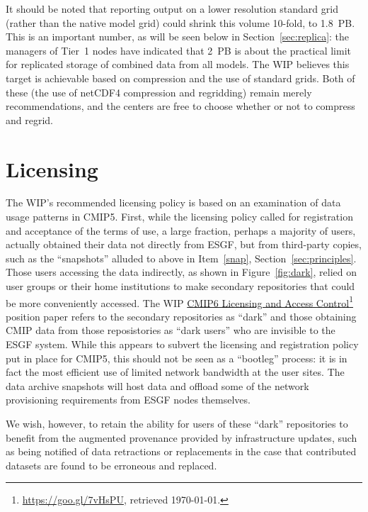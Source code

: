 \documentclass[gmd,manuscript]{copernicus}
\newcommand{\pllabel}[1]{\label{p-#1}\linelabel{l-#1}}
\newcommand{\urlref}[2] {\href{#1}{#2}\footnote{\url{#1}, retrieved \today.}}
\begin{document}
It should be noted that reporting output on a lower
resolution standard grid (rather than the native model grid) could
shrink this volume 10-fold, to 1.8~PB. This is an important number, as
will be seen below in Section~\ref{sec:replica}: the managers of Tier~1 nodes
have indicated that 2~PB is about the practical limit for replicated
storage of combined data from all models. The WIP believes
this target is achievable based on compression and the use of standard
grids. Both of these (the use of netCDF4 compression and regridding)
remain merely recommendations, and the centers are free to choose
whether or not to compress and regrid.

\section{Licensing}
\label{sec:licensing}

The WIP's recommended licensing policy is based on an examination of
data usage patterns in CMIP5. First, while the licensing policy called
for registration and acceptance of the terms of use, a large fraction,
perhaps a majority of users, actually obtained their data not directly
from ESGF, but from
\pllabel{RC1-33}
third-party copies, such as the ``snapshots'' alluded to above in
Item~\ref{snap}, Section~\ref{sec:principles}. Those users accessing
the data indirectly, as shown in Figure~\ref{fig:dark}, relied on user
groups or their home institutions to make secondary repositories that
could be more conveniently accessed. The WIP
\urlref{https://goo.gl/7vHsPU}{CMIP6 Licensing and Access Control}
position paper refers to the secondary repositories as ``dark'' and
those obtaining CMIP data from those reposistories as ``dark users''
who are invisible to the ESGF system. While this appears to subvert
the licensing and registration policy put in place for CMIP5, this
should not be seen as a ``bootleg'' process: it is in fact the most
efficient use of limited network bandwidth at the user sites.
\pllabel{RC2-29}
The data archive snapshots will host data and offload some of the
network provisioning requirements from ESGF nodes themselves.

We wish, however, to retain the ability for users of these ``dark''
repositories to benefit from the augmented provenance provided by
infrastructure updates, such as being notified of data retractions or
replacements in the case that contributed datasets are found to be
erroneous and replaced.
\end{document}
